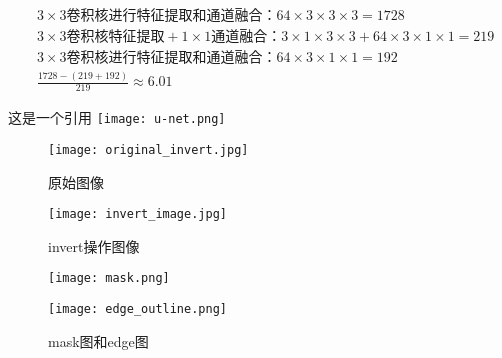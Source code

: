 \documentclass[AutoFakeBold]{LZUThesis}
\begin{document}
\begin{equation}
    \begin{aligned}
         &  & 3\times3\mbox{卷积核进行特征提取和通道融合：}64 \times 3 \times 3 \times 3=1728                                           & \\
         &  & 3\times 3\mbox{卷积核特征提取}+ 1\times 1\mbox{通道融合：}3 \times 1 \times 3 \times 3+ 64 \times 3 \times 1 \times 1=219 & \\
         &  & 3\times3\mbox{卷积核进行特征提取和通道融合：}64\times 3\times1 \times 1  =192                                             & \\
         &  & \frac{1728-(219+192)}{219}\approx 6.01\nonumber                                                                           &
    \end{aligned}
\end{equation}


这是一个引用\textsuperscript{\cite{zhang2017mixup,RN08}}
\texttt{[image: u-net.png]}
\begin{figure}[htbp]
    \begin{minipage}[t]{0.5\linewidth}  %
        \centering
        \texttt{[image: original\_invert.jpg]}
        \label{fig4}
        \caption{原始图像}
    \end{minipage}
    \hfill%
    \begin{minipage}[t]{0.5\linewidth}
        \centering
        \texttt{[image: invert\_image.jpg]}
        \label{fig5}
        \caption{invert操作图像}
    \end{minipage}
\end{figure}



\begin{figure}[htbp]
    \centering
    \begin{minipage}[t]{0.4\linewidth}  %
        \centering
        \texttt{[image: mask.png]}
    \end{minipage}
    \hfill%
    \begin{minipage}[t]{0.5\linewidth}
        \centering
        \texttt{[image: edge\_outline.png]}
    \end{minipage}
    \caption{mask图和edge图}
\end{figure}
\end{document}
